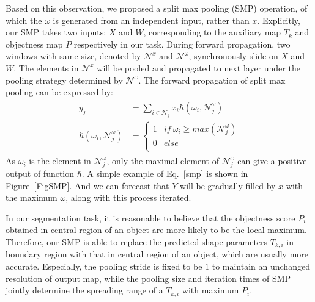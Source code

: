 Based on this observation, we proposed a split max pooling (SMP) operation, of which the $\omega$ is generated from an independent input, rather than $x$.
Explicitly, our SMP takes two inputs: $X$ and $W$, corresponding to the auxiliary map $T_k$ and objectness map $P$ respectively in our task.
During forward propagation, two windows with same size, denoted by $\mathcal{N}^{x}$ and $\mathcal{N}^{\omega}$, synchronously slide on $X$ and $W$.
The elements in $\mathcal{N}^{x}$ will be pooled and propagated to next layer under the pooling strategy determined by $\mathcal{N}^{\omega}$.
The forward propagation of split max pooling can be expressed by:
\begin{eqnarray}\label{smp}
\begin{aligned}
y_{j} &= \sum_{i\in \mathcal{N}_{j}}x_{i}\hbar(\omega_{i},\mathcal{N}^{\omega}_{j})\\
\hbar(\omega_{i},\mathcal{N}^{\omega}_{j})&=\left\{\begin{array}{cc}
1&if~\omega_{i}\geq max(\mathcal{N}^{\omega}_{j})\\
0&else\\
\end{array}\right.
\end{aligned}
\end{eqnarray}
As $\omega_i$ is the element in $\mathcal{N}^{\omega}_{j}$, only the maximal element of $\mathcal{N}^{\omega}_{j}$ can give a positive output of function $\hbar$.
A simple example of Eq.~\ref{smp} is shown in Figure~\ref{FigSMP}.
And we can forecast that $Y$ will be gradually filled by $x$ with the maximum $\omega$, along with this process iterated.

In our segmentation task, it is reasonable to believe that the objectness score $P_i$ obtained in central region of an object are more likely to be the local maximum.
Therefore, our SMP is able to replace the predicted shape parameters $T_{k,i}$ in boundary region with that in central region of an object, which are usually more accurate.
Especially, the pooling stride is fixed to be $1$ to maintain an unchanged resolution of output map, while the pooling size and iteration times of SMP jointly determine the spreading range of a $T_{k,i}$ with maximum $P_i$.

